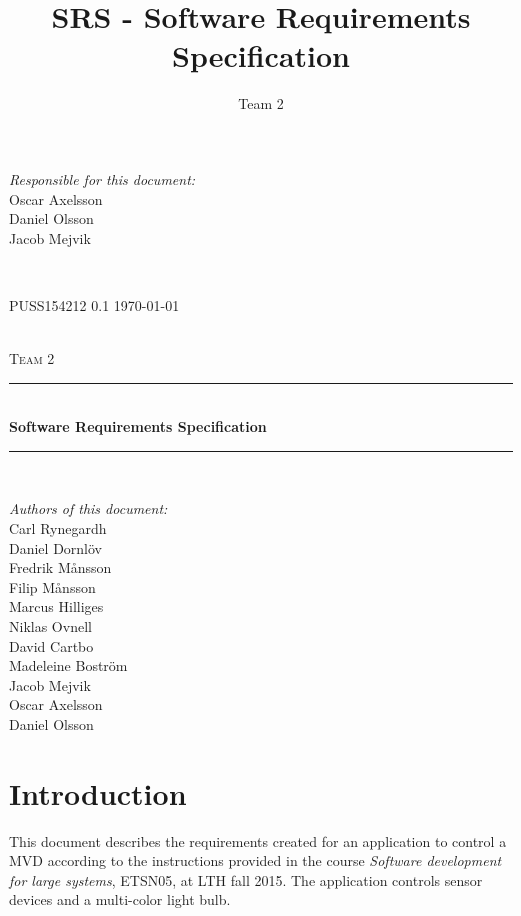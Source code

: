 \documentclass[a4paper]{article}
\title{SRS - Software Requirements Specification}
\author{Team 2}
\begin{document}
\begin{titlepage}
\newcommand{\HRule}{\rule{\linewidth}{0.5mm}}

\begin{minipage}{0.5\textwidth}
\begin{flushleft} %
\textit{Responsible for this document:}\\
Oscar Axelsson \\
Daniel Olsson \\
Jacob Mejvik
\end{flushleft}
\end{minipage}
~
\begin{minipage}{0.4\textwidth}
\begin{flushright}
PUSS154212 0.1
\today
\end{flushright}
\end{minipage}\\[3cm]

\centering
\textsc{\LARGE Team 2}\\[0.5cm]

\HRule \\[0.4cm]
{ \huge \bfseries Software Requirements Specification}\\[0.4cm] %
\HRule \\[1.5cm]

\vfill
\begin{flushleft}
\textit{Authors of this document:}\\
Carl Rynegardh \\
Daniel Dornlöv \\
Fredrik Månsson \\
Filip Månsson \\
Marcus Hilliges \\
Niklas Ovnell \\
David Cartbo \\
Madeleine Boström \\
Jacob Mejvik \\
Oscar Axelsson \\
Daniel Olsson
\end{flushleft}



\end{titlepage}
\setcounter{tocdepth}{2}
\tableofcontents
\newpage
{}

\section{Introduction}
This document describes the requirements created for an application to control a MVD according to the instructions provided in the course \textit{Software development for large systems}, ETSN05, at LTH fall 2015.  The application controls sensor devices and a multi-color light bulb.
\end{document}
